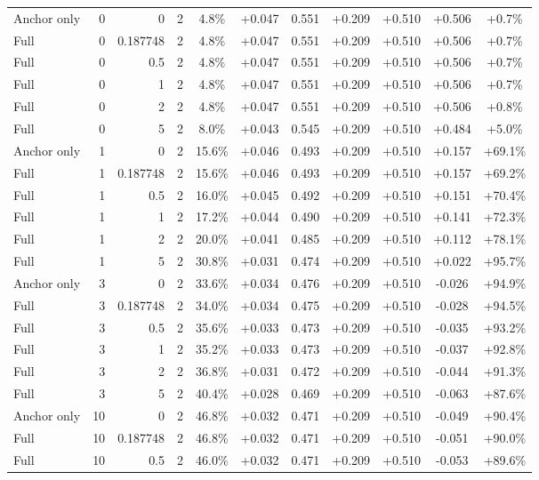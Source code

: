 \begin{table}[htbp]
\begin{tabular}{lrrrccccccc}
Anchor only & 0 & 0 & 2 & 4.8\% & +0.047 & 0.551 & +0.209 & +0.510 & +0.506 & +0.7\% \\
Full & 0 & 0.187748 & 2 & 4.8\% & +0.047 & 0.551 & +0.209 & +0.510 & +0.506 & +0.7\% \\
Full & 0 & 0.5 & 2 & 4.8\% & +0.047 & 0.551 & +0.209 & +0.510 & +0.506 & +0.7\% \\
Full & 0 & 1 & 2 & 4.8\% & +0.047 & 0.551 & +0.209 & +0.510 & +0.506 & +0.7\% \\
Full & 0 & 2 & 2 & 4.8\% & +0.047 & 0.551 & +0.209 & +0.510 & +0.506 & +0.8\% \\
Full & 0 & 5 & 2 & 8.0\% & +0.043 & 0.545 & +0.209 & +0.510 & +0.484 & +5.0\% \\
Anchor only & 1 & 0 & 2 & 15.6\% & +0.046 & 0.493 & +0.209 & +0.510 & +0.157 & +69.1\% \\
Full & 1 & 0.187748 & 2 & 15.6\% & +0.046 & 0.493 & +0.209 & +0.510 & +0.157 & +69.2\% \\
Full & 1 & 0.5 & 2 & 16.0\% & +0.045 & 0.492 & +0.209 & +0.510 & +0.151 & +70.4\% \\
Full & 1 & 1 & 2 & 17.2\% & +0.044 & 0.490 & +0.209 & +0.510 & +0.141 & +72.3\% \\
Full & 1 & 2 & 2 & 20.0\% & +0.041 & 0.485 & +0.209 & +0.510 & +0.112 & +78.1\% \\
Full & 1 & 5 & 2 & 30.8\% & +0.031 & 0.474 & +0.209 & +0.510 & +0.022 & +95.7\% \\
Anchor only & 3 & 0 & 2 & 33.6\% & +0.034 & 0.476 & +0.209 & +0.510 & -0.026 & +94.9\% \\
Full & 3 & 0.187748 & 2 & 34.0\% & +0.034 & 0.475 & +0.209 & +0.510 & -0.028 & +94.5\% \\
Full & 3 & 0.5 & 2 & 35.6\% & +0.033 & 0.473 & +0.209 & +0.510 & -0.035 & +93.2\% \\
Full & 3 & 1 & 2 & 35.2\% & +0.033 & 0.473 & +0.209 & +0.510 & -0.037 & +92.8\% \\
Full & 3 & 2 & 2 & 36.8\% & +0.031 & 0.472 & +0.209 & +0.510 & -0.044 & +91.3\% \\
Full & 3 & 5 & 2 & 40.4\% & +0.028 & 0.469 & +0.209 & +0.510 & -0.063 & +87.6\% \\
Anchor only & 10 & 0 & 2 & 46.8\% & +0.032 & 0.471 & +0.209 & +0.510 & -0.049 & +90.4\% \\
Full & 10 & 0.187748 & 2 & 46.8\% & +0.032 & 0.471 & +0.209 & +0.510 & -0.051 & +90.0\% \\
Full & 10 & 0.5 & 2 & 46.0\% & +0.032 & 0.471 & +0.209 & +0.510 & -0.053 & +89.6\% \\

\end{tabular}
\end{table}
